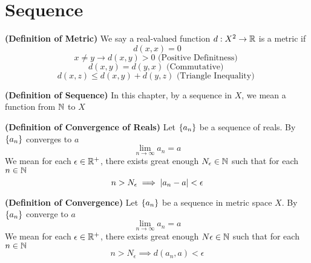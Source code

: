 \documentclass{report}
\begin{document}
\section{Sequence}
\begin{definition}
\label{1.1.1}
\textbf{(Definition of Metric)} We say a real-valued function $d:X^2\rightarrow \mathbb{R}$ is a metric if
\begin{equation}
d(x,x)=0 
\end{equation}
\begin{equation}
x\neq y\longrightarrow d(x,y)>0\text{ (Positive Definitness) }
\end{equation}
\begin{equation}
d(x,y)=d(y,x)\text{ (Commutative) }
\end{equation}
\begin{equation}
d(x,z)\leq d(x,y)+d(y,z)\text{ (Triangle Inequality) }
\end{equation}
\end{definition}
\begin{definition}
\label{1.1.2}
\textbf{(Definition of Sequence)} In this chapter, by a sequence in $X$, we mean a function from  $\mathbb{N}$ to  $X$
\end{definition}
\begin{definition}
\label{1.1.3}
\textbf{(Definition of Convergence of Reals)} Let $\{ a_n \}$ be a sequence of reals. By $\{ a_n \}$ converges to $a$ 
\begin{equation}
\lim_{n\to\infty} a_n=a
\end{equation}
We mean for each $\epsilon \in\mathbb{R}^+$, there exists great enough $N_\epsilon \in\mathbb{N}$  such that for each $n\in\mathbb{N}$ 
\begin{equation}
n>N_\epsilon \implies \left|a_n-a\right|<\epsilon 
\end{equation}
\end{definition}
\begin{definition}
\label{1.1.4}
\textbf{(Definition of Convergence)} Let $\{ a_n \}$ be a sequence in metric space $X$. By $\{ a_n \}$ converge to $a$
\begin{equation}
\lim_{n\to\infty}a_n=a
\end{equation}
We mean for each $\epsilon \in\mathbb{R}^+$, there exists great enough $N\epsilon \in\mathbb{N}$ such that for each $n\in\mathbb{N}$
 \begin{equation}
n>N_\epsilon \implies d(a_n,a)<\epsilon 
\end{equation}
\end{definition}
\end{document}
